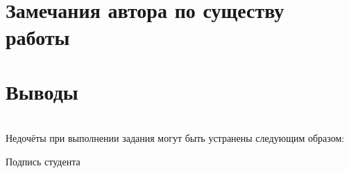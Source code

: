 \section{Замечания автора \textnormal{\small по существу работы} \uline{\hfill}}
\uline{\hfill}

\uline{\hfill}

\uline{\hfill}

\section{Выводы}
\uline{\hfill}

\uline{\hfill}

\uline{\hfill}

\uline{\hfill}

\uline{\hfill}

\uline{\hfill}

\uline{\hfill}

\uline{\hfill}

\uline{\hfill}

\uline{\hfill}

\uline{\hfill}

\uline{\hfill}

\uline{\hfill} \\

Недочёты при выполнении задания могут быть устранены следующим образом: \uline{\hfill}

\uline{\hfill}

\uline{\hfill}

\uline{\hfill}

\uline{\hfill}

\uline{\hfill}

\begin{flushright}
  Подпись студента \uline{\hspace{3cm}} \,\,\,\,\,\,\,\,\,
\end{flushright}